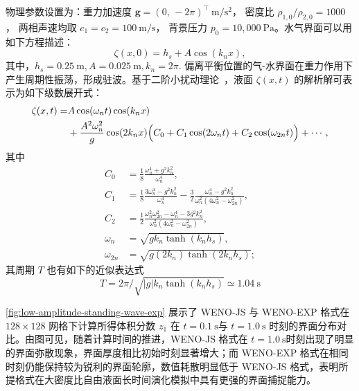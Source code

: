 \documentclass[12pt,a4paper]{article}
\numberwithin{equation}{section}    %
\begin{document}
物理参数设置为：重力加速度 $\bm{g} = (0,\, -2\pi)^\top~\mathrm{m/s^2}$，
密度比 $\rho_{1,0}/\rho_{2,0} = 1000$，
两相声速均取 $c_1 = c_2 = 100~\mathrm{m/s}$，
背景压力 $p_0 = 10{,}000~\mathrm{Pa}$。水气界面可以用如下方程描述：
\begin{equation}
    \zeta(x,0) = h_s + A \cos(k_n x),
\end{equation}
其中，$h_s = 0.25~\mathrm{m}, A = 0.025~\mathrm{m}, k_n = 2\pi$. 偏离平衡位置的气-水界面在重力作用下产生周期性振荡，形成驻波。基于二阶小扰动理论~\cite{Frandsen2003}，液面 $\zeta(x, t)$ 的解析解可表示为如下级数展开式：
\begin{equation}
    \begin{aligned}
        \zeta(x, t)
        = &A\cos(\omega_n t)\cos(k_n x)\\
        &+ \frac{A^2\omega_n^2}{g}\cos(2k_n x)
          \Bigl(C_0 + C_1\cos(2\omega_n t) + C_2\cos(\omega_{2n} t)\Bigr)
        + \cdots,
    \end{aligned}
\end{equation}
其中
\begin{equation}
    \begin{aligned}
        C_0 &= \frac{1}{8}\frac{\omega_n^4 + g^2k_n^2}{\omega_n^4}, \\[6pt]
        C_1 &= \frac{1}{8}\frac{3\omega_n^4 - g^2k_n^2}{\omega_n^4}
               - \frac{3}{2}\frac{\omega_n^4 - g^2k_n^2}{\omega_n^2(4\omega_n^2 - \omega_{2n}^2)}, \\[6pt]
        C_2 &= \frac{1}{2}\frac{\omega_n^2\omega_{2n}^2 - \omega_n^4 - 3g^2k_n^2}
                              {\omega_n^2(4\omega_n^2 - \omega_{2n}^2)},\\[6pt]
        \omega_n &= \sqrt{g k_n \tanh(k_n h_s)},\\[6pt]
        \omega_{2n} &= \sqrt{g (2k_n) \tanh(2k_n h_s)};
    \end{aligned}
\end{equation}
其周期 $T$ 也有如下的近似表达式
\begin{equation}
    T = 2\pi / \sqrt{|g| k_n \tanh(k_n h_s)} \simeq 1.04~\mathrm{s}
\end{equation}

\autoref{fig:low-amplitude-standing-wave-exp} 展示了 WENO-JS 与 WENO-EXP 格式在 $128\times 128$ 网格下计算所得体积分数 $z_1$ 在 $t = 0.1~\mathrm{s}$与 $t = 1.0~\mathrm{s}$ 时刻的界面分布对比。由图可见，随着计算时间的推进，WENO-JS 格式在 $t = 1.0~\mathrm{s}$时刻出现了明显的界面弥散现象，界面厚度相比初始时刻显著增大；而 WENO-EXP 格式在相同时刻仍能保持较为锐利的界面轮廓，数值耗散明显低于 WENO-JS 格式，表明所提格式在大密度比自由液面长时间演化模拟中具有更强的界面捕捉能力。
\end{document}
